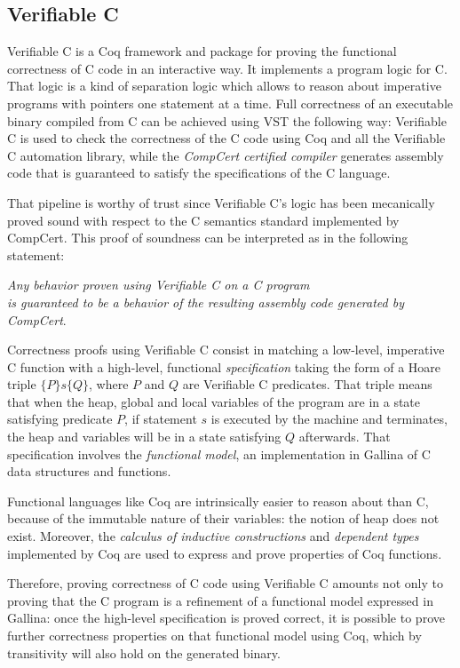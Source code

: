 \documentclass[11pt]{article}
\begin{document}
\subsection{Verifiable C}

Verifiable C is a Coq framework and package for proving the functional correctness of C code in an interactive way.
It implements a program logic for C. That logic is a kind of separation logic which allows to reason about imperative programs with pointers one statement at a time.
Full correctness of an executable binary compiled from C can be achieved using VST the following way:
Verifiable C is used to check the correctness of the C code using Coq and all the Verifiable C automation library,
while the \emph{CompCert certified compiler} generates assembly code that is guaranteed to satisfy the specifications of the C language.

That pipeline is worthy of trust since Verifiable C's logic has been mecanically proved sound with respect to the C semantics standard implemented by CompCert.
This proof of soundness can be interpreted as in the following statement:
\begin{center}\emph{Any behavior proven using Verifiable C on a C program\\
is guaranteed to be a behavior of the resulting assembly code generated by CompCert}.\end{center}

Correctness proofs using Verifiable C consist in matching a low-level, imperative C function with a high-level, functional \emph{specification}
taking the form of a Hoare triple $\{ P \} s \{ Q \}$, where $P$ and $Q$ are Verifiable C predicates.
That triple means that when the heap, global and local variables of the program are in a state satisfying predicate $P$,
if statement $s$ is executed by the machine and terminates, the heap and variables will be in a state satisfying $Q$ afterwards.
That specification involves the \emph{functional model}, an implementation in Gallina of C data structures and functions.

Functional languages like Coq are intrinsically easier to reason about than C, because of the immutable nature of their variables: the notion of heap does not exist.
Moreover, the \emph{calculus of inductive constructions} and \emph{dependent types} implemented by Coq are used to
express and prove properties of Coq functions.

Therefore, proving correctness of C code using Verifiable C amounts not only to proving that the C program is a refinement of a functional model expressed in Gallina:
once the high-level specification is proved correct, it is possible to prove further correctness properties on that functional model using Coq,
which by transitivity will also hold on the generated binary.
\end{document}
